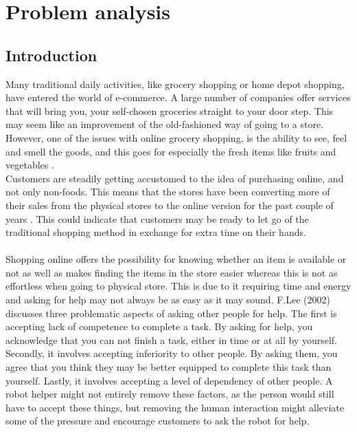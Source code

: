 \part{Problem analysis}\label{Part:PA}
\chapter{Introduction}\label{ch:introduction}
Many traditional daily activities, like grocery shopping or home depot shopping, have entered the world of e-commerce. A large number of companies offer services that will bring you, your self-chosen groceries straight to your door step. This may seem like an improvement of the old-fashioned way of going to a store. However, one of the issues with online grocery shopping, is the ability to see, feel and smell the goods, and this goes for especially the fresh items like fruits and vegetables \cite{GroceryDive}.\\

Customers are steadily getting accustomed to the idea of purchasing online, and not only non-foods. This means that the stores have been converting more of their sales from the physical stores to the online version for the past couple of years \cite{Quartz}. This could indicate that customers may be ready to let go of the traditional shopping method in exchange for extra time on their hands.\\
\\
Shopping online offers the possibility for knowing whether an item is available or not as well as makes finding the items in the store easier whereas this is not as effortless when going to physical store. This is due to it requiring time and energy and asking for help may not always be as easy as it may sound. F.Lee (2002) \cite{AskingHelp} discusses three problematic aspects of asking other people for help. The first is accepting lack of competence to complete a task. By asking for help, you acknowledge that you can not finish a task, either in time or at all by yourself. Secondly, it involves accepting inferiority to other people. By asking them, you agree that you think they may be better equipped to complete this task than yourself. Lastly, it involves accepting a level of dependency of other people. A robot helper might not entirely remove these factors, as the person would still have to accept these things, but removing the human interaction might alleviate some of the pressure and encourage customers to ask the robot for help.\\

